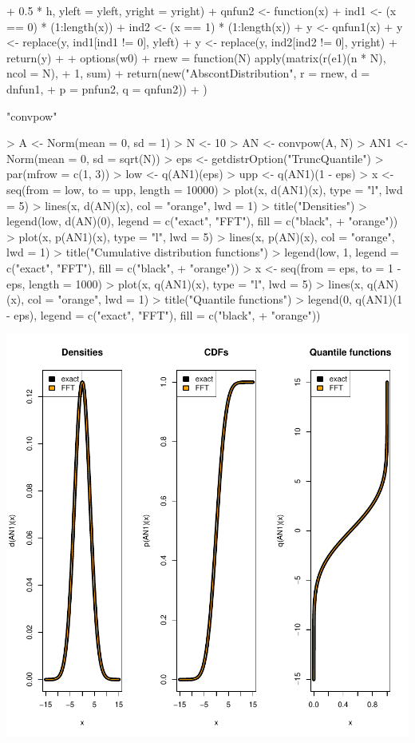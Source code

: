 \documentclass[11pt]{article}
\begin{document}
\begin{Schunk}
\begin{Sinput}
{+             0.5 * h, yleft = yleft, yright = yright)
+         qnfun2 <- function(x) {
+             ind1 <- (x == 0) * (1:length(x))
+             ind2 <- (x == 1) * (1:length(x))
+             y <- qnfun1(x)
+             y <- replace(y, ind1[ind1 != 0], yleft)
+             y <- replace(y, ind2[ind2 != 0], yright)
+             return(y)
+         }
+         options(w0)
+         rnew = function(N) apply(matrix(r(e1)(n * N), ncol = N), 
+             1, sum)
+         return(new("AbscontDistribution", r = rnew, d = dnfun1, 
+             p = pnfun2, q = qnfun2))
+     })
\end{Sinput}
\begin{Soutput}
[1] "convpow"
\end{Soutput}
\begin{Sinput}
> A <- Norm(mean = 0, sd = 1)
> N <- 10
> AN <- convpow(A, N)
> AN1 <- Norm(mean = 0, sd = sqrt(N))
> eps <- getdistrOption("TruncQuantile")
> par(mfrow = c(1, 3))
> low <- q(AN1)(eps)
> upp <- q(AN1)(1 - eps)
> x <- seq(from = low, to = upp, length = 10000)
> plot(x, d(AN1)(x), type = "l", lwd = 5)
> lines(x, d(AN)(x), col = "orange", lwd = 1)
> title("Densities")
> legend(low, d(AN)(0), legend = c("exact", "FFT"), fill = c("black", 
+     "orange"))
> plot(x, p(AN1)(x), type = "l", lwd = 5)
> lines(x, p(AN)(x), col = "orange", lwd = 1)
> title("Cumulative distribution functions")
> legend(low, 1, legend = c("exact", "FFT"), fill = c("black", 
+     "orange"))
> x <- seq(from = eps, to = 1 - eps, length = 1000)
> plot(x, q(AN1)(x), type = "l", lwd = 5)
> lines(x, q(AN)(x), col = "orange", lwd = 1)
> title("Quantile functions")
> legend(0, q(AN1)(1 - eps), legend = c("exact", "FFT"), fill = c("black", 
+     "orange"))
\end{Sinput}
\end{Schunk}
\includegraphics{distr-nFoldConvolution}
\end{document}
